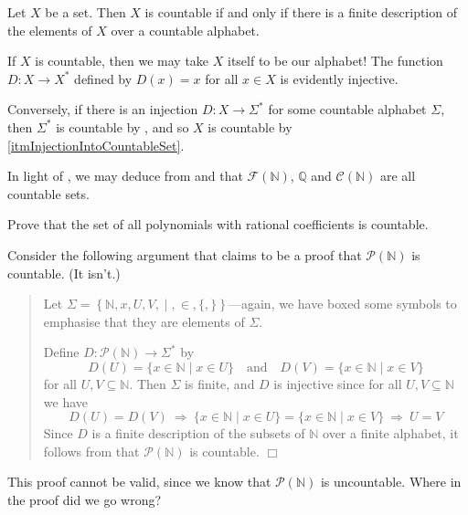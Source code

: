 \begin{theorem}
\label{thmCountableIffFiniteDescription}
Let $X$ be a set. Then $X$ is countable if and only if there is a finite description of the elements of $X$ over a countable alphabet.
\end{theorem}

\begin{cproof}
If $X$ is countable, then we may take $X$ itself to be our alphabet! The function $D : X \to X^*$ defined by $D(x) = x$ for all $x \in X$ is evidently injective.

Conversely, if there is an injection $D : X \to \Sigma^*$ for some countable alphabet $\Sigma$, then $\Sigma^*$ is countable by , and so $X$ is countable by \ref{itmInjectionIntoCountableSet}.
\end{cproof}

\begin{example}
In light of , we may deduce from  and  that $\mathcal{F}(\mathbb{N})$, $\mathbb{Q}$ and $\mathcal{C}(\mathbb{N})$ are all countable sets.
\end{example}

\begin{exercise}
Prove that the set of all polynomials with rational coefficients is countable.
\end{exercise}

\begin{exercise}
Consider the following argument that claims to be a proof that $\mathcal{P}(\mathbb{N})$ is countable. (It isn't.)
\begin{quote}
Let $\Sigma = \left\{ \mathbb{N},x,U,V,\boxed{\mid},\boxed{\in},\boxed{\{},\boxed{\}} \right\}$---again, we have boxed some symbols to emphasise that they are elements of $\Sigma$.

Define $D : \mathcal{P}(\mathbb{N}) \to \Sigma^*$ by
\[ D(U) = \{ x \in \mathbb{N} \mid x \in U \} \quad \text{and} \quad D(V) = \{ x \in \mathbb{N} \mid x \in V \} \]
for all $U, V \subseteq \mathbb{N}$. Then $\Sigma$ is finite, and $D$ is injective since for all $U,V \subseteq \mathbb{N}$ we have
\[ D(U) = D(V) ~ \Rightarrow ~ \{ x \in \mathbb{N} \mid x \in U \} = \{ x \in \mathbb{N} \mid x \in V \} ~ \Rightarrow ~ U = V \]
Since $D$ is a finite description of the subsets of $\mathbb{N}$ over a finite alphabet, it follows from  that $\mathcal{P}(\mathbb{N})$ is countable. \hfill $\Box$
\end{quote}
This proof cannot be valid, since we know that $\mathcal{P}(\mathbb{N})$ is uncountable. Where in the proof did we go wrong?
\end{exercise}

